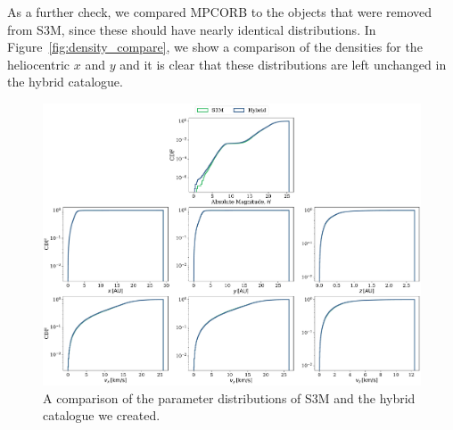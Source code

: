 \documentclass[twocolumn]{aastex631}
\newcommand{\sss}{S3M}
\newcommand{\mpco}{MPCORB}
\begin{document}
As a further check, we compared \mpco{} to the objects that were removed from \sss{}, since these should have nearly identical distributions. In Figure~\ref{fig:density_compare}, we show a comparison of the densities for the heliocentric $x$ and $y$ and it is clear that these distributions are left unchanged in the hybrid catalogue.
\begin{figure}[htb]
    \centering
    \includegraphics[width=\textwidth]{hybrid_vs_s3m_distributions.pdf}
    \caption{A comparison of the parameter distributions of \sss{} \citep{Grav+2011} and the hybrid catalogue we created.}
    \label{fig:hybrid_vs_s3m_dists}
\end{figure}
\end{document}
